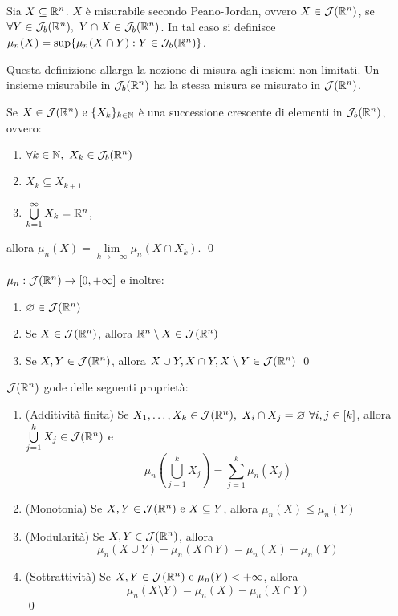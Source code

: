 \begin{definition}
    Sia $X\subseteq \mathbb{R}^n$. $X$ è misurabile secondo Peano-Jordan, ovvero $X \in \mathcal{J}(\mathbb{R}^n)$, se $\forall Y \in \mathcal{J}_b(\mathbb{R}^n), \ Y \cap X \in \mathcal{J}_b(\mathbb{R}^n)$. In tal caso si definisce $\mu_n(X)=\sup\{\mu_n(X\cap Y):Y\in \mathcal{J}_b(\mathbb{R}^n)\}$.
\end{definition}

\begin{remark}
    Questa definizione allarga la nozione di misura agli insiemi non limitati. Un insieme misurabile in $\mathcal{J}_b(\mathbb{R}^n)$ ha la stessa misura se misurato in $\J(\R^n)$.
\end{remark}

\begin{theorem}
    Se $X \in \mathcal{J}(\mathbb{R}^n) \text{ e } \{X_k\}_{k \in \mathbb{N}}$ è una successione crescente di elementi in $\mathcal{J}_b(\mathbb{R}^n)$, ovvero:
    \begin{enumerate}
        \item $\forall k \in \mathbb{N}, \ X_k \in \mathcal{J}_b(\mathbb{R}^n)$
        \item $X_k \subseteq X_{k+1}$
        \item $\bigcup\limits_{k=1}^{\infty}X_k = \mathbb{R}^n$,
    \end{enumerate}
    allora $\mu_n(X)=\lim\limits_{k\to + \infty}\mu_n(X\cap X_k)$.
    \qed
\end{theorem}

\begin{theorem}
    $\mu_n: \mathcal{J}(\mathbb{R}^n) \to [0, +\infty]$ e inoltre:
    \begin{enumerate}
        \item $\varnothing \in \mathcal{J}(\mathbb{R}^n)$
        \item Se $X \in \mathcal{J}(\mathbb{R}^n)$, allora $\mathbb{R}^n \setminus X \in \mathcal{J}(\mathbb{R}^n)$
        \item Se $X, Y \in \mathcal{J}(\mathbb{R}^n)$, allora $X \cup Y, X \cap Y, X \setminus Y \in \mathcal{J}(\mathbb{R}^n)$
        \qed
    \end{enumerate}
\end{theorem}

\begin{theorem}
    [Proprietà di $\J(\R^n)$]\label{thm:prop_J}
    $\J(\R^n)$ gode delle seguenti proprietà:
    \begin{enumerate}
        \item (Additività finita) Se $X_1,\dots,X_k \in \mathcal{J}(\mathbb{R}^n), \ X_i \cap X_j = \varnothing \ \forall i, j \in [k]$, allora $\bigcup\limits_{j=1}^kX_j \in \mathcal{J}(\mathbb{R}^n)$ e
        $$
            \mu_n\left(\bigcup_{j=1}^kX_j\right) = \sum_{j=1}^k\mu_n(X_j)
        $$
        \item (Monotonia) Se $X, Y \in \mathcal{J}(\mathbb{R}^n) \text{ e } X \subseteq Y$, allora $\mu_n(X) \leq \mu_n(Y)$
        \item (Modularità) Se $X, Y \in \mathcal{J}(\mathbb{R}^n)$, allora
        $$
            \mu_n(X \cup Y) + \mu_n (X \cap Y) = \mu_n(X) + \mu_n(Y)
        $$
        \item (Sottrattività) Se $X, Y \in \mathcal{J}(\mathbb{R}^n) \text{ e } \mu_n(Y) < + \infty$, allora
        $$
            \mu_n(X \setminus Y) = \mu_n(X) - \mu_n(X \cap Y)
        $$
        \qed
    \end{enumerate}
\end{theorem}

